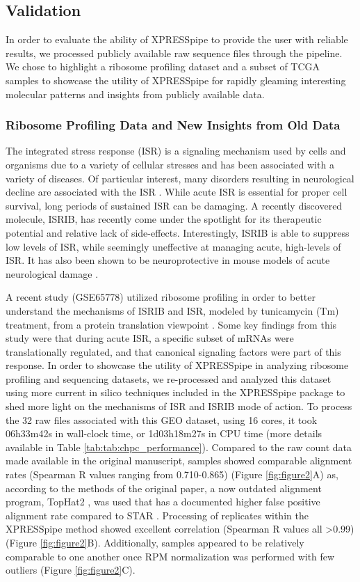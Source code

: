 \documentclass[11pt, a4paper, oneside]{article}
\begin{document}
\subsection{Validation}
In order to evaluate the ability of XPRESSpipe to provide the user with reliable results, we processed publicly available raw sequence files through the pipeline. We chose to highlight a ribosome profiling dataset and a subset of TCGA samples to showcase the utility of XPRESSpipe for rapidly gleaming interesting molecular patterns and insights from publicly available data.

\subsubsection{Ribosome Profiling Data and New Insights from Old Data}
The integrated stress response (ISR) is a signaling mechanism used by cells and organisms due to a variety of cellular stresses and has been associated with a variety of diseases. Of particular interest, many disorders resulting in neurological decline are associated with the ISR \cite{isr_disease}. While acute ISR is essential for proper cell survival, long periods of sustained ISR can be damaging. A recently discovered molecule, ISRIB, has recently come under the spotlight for its therapeutic potential and relative lack of side-effects. Interestingly, ISRIB is able to suppress low levels of ISR, while seemingly uneffective at managing acute, high-levels of ISR. It has also been shown to be neuroprotective in mouse models of acute neurological damage \cite{isrib_activation, isrib_structure, isrib_riboseq, isrib_neuroprotective}.

A recent study (GSE65778) utilized ribosome profiling in order to better understand the mechanisms of ISRIB and ISR, modeled by tunicamycin (Tm) treatment, from a protein translation viewpoint \cite{isrib_riboseq}. Some key findings from this study were that during acute ISR, a specific subset of mRNAs were translationally regulated, and that canonical signaling factors were part of this response. In order to showcase the utility of XPRESSpipe in analyzing ribosome profiling and sequencing datasets, we re-processed and analyzed this dataset using more current in silico techniques included in the XPRESSpipe package to shed more light on the mechanisms of ISR and ISRIB mode of action. To process the 32 raw files associated with this GEO dataset, using 16 cores, it took 06h33m42s in wall-clock time, or 1d03h18m27s in CPU time (more details available in Table \ref{tab:tab:chpc_performance}). Compared to the raw count data made available in the original manuscript, samples showed comparable alignment rates (Spearman R values ranging from 0.710-0.865) (Figure \ref{fig:figure2}A) as, according to the methods of the original paper, a now outdated alignment program, TopHat2 \cite{tophat2}, was used that has a documented higher false positive alignment rate compared to STAR \cite{alignment_benchmark, star}. Processing of replicates within the XPRESSpipe method showed excellent correlation (Spearman R values all \textgreater 0.99) (Figure \ref{fig:figure2}B). Additionally, samples appeared to be relatively comparable to one another once RPM normalization was performed with few outliers (Figure \ref{fig:figure2}C).
\end{document}
